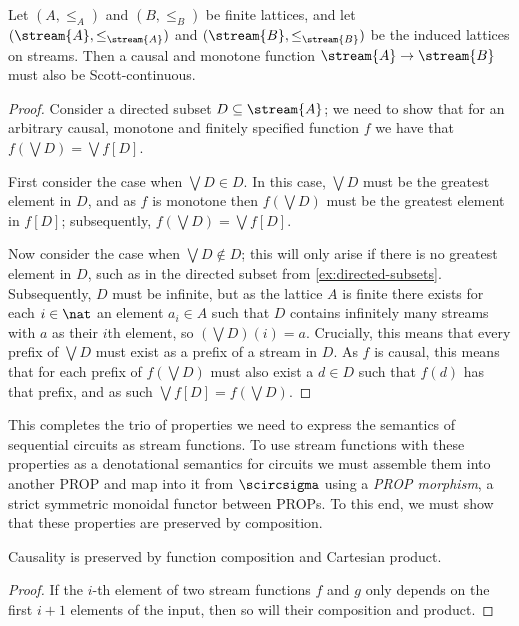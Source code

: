 \begin{lemma}
    Let \((A, \leq_A)\) and \((B, \leq_B)\) be finite lattices, and let
    \((\stream{A}, \leq_{\stream{A}})\) and \((\stream{B}, \leq_{\stream{B}})\)
    be the induced lattices on streams.
    Then a causal and monotone function \(\stream{A} \to \stream{B}\) must also
    be Scott-continuous.
\end{lemma}
\begin{proof}
    Consider a directed subset \(D \subseteq \stream{A}\); we need to show that for an
    arbitrary causal, monotone and finitely specified function \(f\) we have
    that \(f\left(\bigvee D\right) = \bigvee f[D]\).

    First consider the case when \(\bigvee D \in D\).
    In this case, \(\bigvee D\) must be the greatest element in \(D\), and as
    \(f\) is monotone then \(f(\bigvee D)\) must be the greatest element in
    \(f[D]\); subsequently, \(f\left(\bigvee D\right) = \bigvee f[D]\).

    Now consider the case when \(\bigvee D \not\in D\); this will only arise if
    there is no greatest element in \(D\), such as in the directed subset from
    \cref{ex:directed-subsets}.
    Subsequently, \(D\) must be infinite, but as the lattice \(A\) is finite
    there exists for each \(i \in \nat\) an element \(a_i \in A\) such that
    \(D\) contains infinitely many streams with \(a\) as their \(i\)th element,
    so \(\left(\bigvee D\right)(i) = a\).
    Crucially, this means that every prefix of \(\bigvee D\) must exist as a
    prefix of a stream in \(D\).
    As \(f\) is causal, this means that for each prefix of
    \(f\left(\bigvee D\right)\) must also exist a \(d \in D\) such that
    \(f(d)\) has that prefix, and as such
    \(\bigvee f[D] = f\left(\bigvee D\right)\).
\end{proof}

This completes the trio of properties we need to express the semantics of
sequential circuits as stream functions.
To use stream functions with these properties as a denotational semantics for
circuits we must assemble them into another PROP and map into it from
\(\scircsigma\) using a \emph{PROP morphism}, a strict symmetric monoidal
functor between PROPs.
To this end, we must show that these properties are preserved by composition.

\begin{lemma}\label{lem:causality-preserved}
    Causality is preserved by function composition and Cartesian product.
\end{lemma}
\begin{proof}
    If the \(i\)-th element of two stream functions \(f\) and \(g\) only depends
    on the first \(i+1\) elements of the input, then so will their composition
    and product.
\end{proof}

